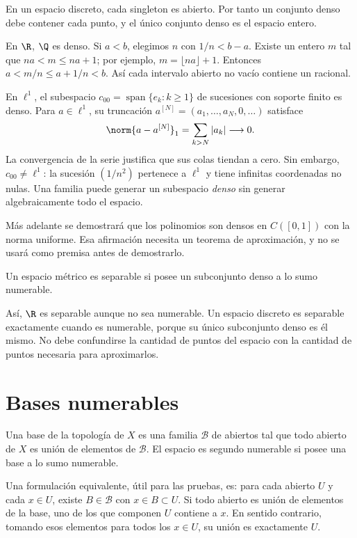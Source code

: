 \begin{ejemplo}
En un espacio discreto, cada singleton es abierto. Por tanto un conjunto denso debe contener cada punto, y el único conjunto denso es el espacio entero.

En $\R$, $\Q$ es denso. Si $a<b$, elegimos $n$ con $1/n<b-a$. Existe un entero $m$ tal que $na<m\le na+1$; por ejemplo, $m=\lfloor na\rfloor+1$. Entonces $a<m/n\le a+1/n<b$. Así cada intervalo abierto no vacío contiene un racional.

En $\ell^1$, el subespacio $c_{00}=\operatorname{span}\{e_k:k\ge1\}$ de sucesiones con soporte finito es denso. Para $a\in\ell^1$, su truncación $a^{[N]}=(a_1,\ldots,a_N,0,\ldots)$ satisface
\[
\norm{a-a^{[N]}}_1=\sum_{k>N}|a_k|\longrightarrow0.
\]
La convergencia de la serie justifica que sus colas tiendan a cero. Sin embargo, $c_{00}\ne\ell^1$: la sucesión $(1/n^2)$ pertenece a $\ell^1$ y tiene infinitas coordenadas no nulas. Una familia puede generar un subespacio \emph{denso} sin generar algebraicamente todo el espacio.
\end{ejemplo}
Más adelante se demostrará que los polinomios son densos en $C([0,1])$ con la norma uniforme. Esa afirmación necesita un teorema de aproximación, y no se usará como premisa antes de demostrarlo.

\begin{definicion}
Un espacio métrico es separable si posee un subconjunto denso a lo sumo numerable.
\end{definicion}
Así, $\R$ es separable aunque no sea numerable. Un espacio discreto es separable exactamente cuando es numerable, porque su único subconjunto denso es él mismo. No debe confundirse la cantidad de puntos del espacio con la cantidad de puntos necesaria para aproximarlos.

\section{Bases numerables}
\begin{definicion}
Una base de la topología de $X$ es una familia $\mathcal B$ de abiertos tal que todo abierto de $X$ es unión de elementos de $\mathcal B$. El espacio es segundo numerable si posee una base a lo sumo numerable.
\end{definicion}
Una formulación equivalente, útil para las pruebas, es: para cada abierto $U$ y cada $x\in U$, existe $B\in\mathcal B$ con $x\in B\subset U$. Si todo abierto es unión de elementos de la base, uno de los que componen $U$ contiene a $x$. En sentido contrario, tomando esos elementos para todos los $x\in U$, su unión es exactamente $U$.

